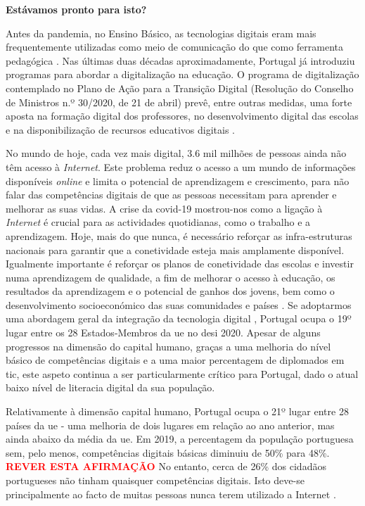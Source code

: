 \textbf{Estávamos pronto para isto?}

Antes da pandemia, no Ensino Básico, as tecnologias digitais eram mais frequentemente utilizadas como meio de comunicação do que como ferramenta pedagógica \cite{oecd_using_2021}. Nas últimas duas décadas aproximadamente, Portugal já introduziu programas para abordar a digitalização na educação. O programa de digitalização contemplado no Plano de Ação para a Transição Digital (Resolução do Conselho de Ministros n.º 30/2020, de 21 de abril) prevê, entre outras medidas, uma forte aposta na formação digital dos professores, no desenvolvimento digital das escolas e na disponibilização de recursos educativos digitais \cite{transicaodigital} \cite{capacitacaodigital}.

No mundo de hoje, cada vez mais digital, 3.6 mil milhões de pessoas ainda não têm acesso à \textit{Internet}\cite{TheDigitransf}. Este problema reduz o acesso a um mundo de informações disponíveis \textit{online} e limita o potencial de aprendizagem e crescimento, para não falar das competências digitais de que as pessoas necessitam para aprender e melhorar as suas vidas. 
A crise da \acrshort{covid-19} mostrou-nos como a ligação à \textit{Internet} é crucial para as actividades quotidianas, como o trabalho e a aprendizagem. Hoje, mais do que nunca, é necessário reforçar as infra-estruturas nacionais para garantir que a conetividade esteja mais amplamente disponível. Igualmente importante é reforçar os planos de conetividade das escolas e investir numa aprendizagem de qualidade, a fim de melhorar o acesso à educação, os resultados da aprendizagem e o potencial de ganhos dos jovens, bem como o desenvolvimento socioeconómico das suas comunidades e países \cite{TheDigitransf}.
Se adoptarmos uma abordagem geral da integração da tecnologia digital \cite{DESI2020}, Portugal ocupa o 19º lugar entre os 28  Estados-Membros da \acrfull{ue} no \acrfull{desi} 2020.
Apesar de alguns progressos na dimensão do capital humano, graças a uma melhoria do nível básico de competências digitais e a uma maior percentagem de diplomados em \acrfull{tic}, este aspeto continua a ser particularmente crítico para Portugal, dado o atual baixo nível de literacia digital da sua população.

Relativamente à dimensão capital humano, Portugal ocupa o 21º lugar entre 28 países da \acrshort{ue} - uma melhoria de dois lugares em relação ao ano anterior, mas ainda abaixo da média da \acrshort{ue}. Em 2019, a percentagem da população portuguesa sem, pelo menos, competências digitais básicas diminuiu de 50\% para 48\%. \textcolor{red}{\textbf{REVER ESTA AFIRMAÇÃO}}
No entanto, cerca de 26\% dos cidadãos portugueses não tinham quaisquer competências digitais. Isto deve-se principalmente ao facto de muitas pessoas nunca terem utilizado a Internet \cite{DESI2020}.


